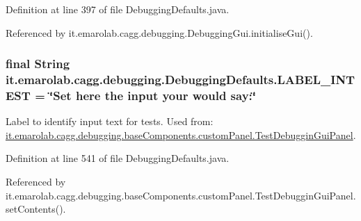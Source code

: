 Definition at line 397 of file Debugging\-Defaults.\-java.



Referenced by it.\-emarolab.\-cagg.\-debugging.\-Debugging\-Gui.\-initialise\-Gui().

\hypertarget{classit_1_1emarolab_1_1cagg_1_1debugging_1_1DebuggingDefaults_aebaf478f1c0a8b248f6f914c513aa5b1}{
\subsubsection[{L\-A\-B\-E\-L\-\_\-\-I\-N\-T\-E\-S\-T}]{\setlength{\rightskip}{0pt plus 5cm}final String it.\-emarolab.\-cagg.\-debugging.\-Debugging\-Defaults.\-L\-A\-B\-E\-L\-\_\-\-I\-N\-T\-E\-S\-T = \char`\"{}Set here the input your would say\-:\char`\"{}\hspace{0.3cm}{\ttfamily [static]}}}\label{classit_1_1emarolab_1_1cagg_1_1debugging_1_1DebuggingDefaults_aebaf478f1c0a8b248f6f914c513aa5b1}
Label to identify input text for tests. Used from\-: \hyperlink{classit_1_1emarolab_1_1cagg_1_1debugging_1_1baseComponents_1_1customPanel_1_1TestDebugginGuiPanel}{it.\-emarolab.\-cagg.\-debugging.\-base\-Components.\-custom\-Panel.\-Test\-Debuggin\-Gui\-Panel}. 

Definition at line 541 of file Debugging\-Defaults.\-java.



Referenced by it.\-emarolab.\-cagg.\-debugging.\-base\-Components.\-custom\-Panel.\-Test\-Debuggin\-Gui\-Panel.\-set\-Contents().


